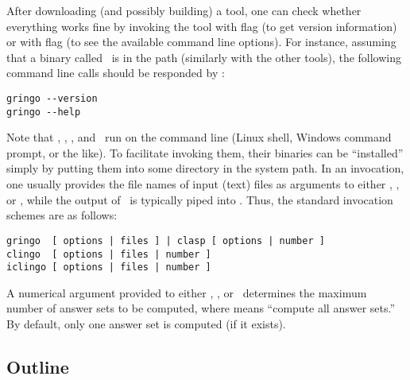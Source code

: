 After downloading (and possibly building) a tool,
one can check whether everything works fine by invoking the tool
with flag  (to get version information) or
with flag  (to see the available command line options).
For instance, assuming that a binary called \gringo\ is in the path
(similarly with the other tools),
the following command line calls should be responded by \gringo:
%
\begin{lstlisting}[numbers=none]
gringo --version
gringo --help
\end{lstlisting}
Note that \gringo, \clasp, \clingo, and \iclingo\ 
run on the command line (Linux shell, Windows command prompt, or the like).
To facilitate invoking them, their binaries can be ``installed''
simply by putting them into some directory in the system path.
In an invocation,
one usually provides the file names of input (text) files 
as arguments to either \gringo, \clingo, or \iclingo,
while the output of \gringo\ is typically piped into \clasp.
Thus, the standard invocation schemes are as follows:
\begin{lstlisting}[numbers=none]
gringo  [ options | files ] | clasp [ options | number ]
clingo  [ options | files | number ]
iclingo [ options | files | number ]
\end{lstlisting}
A numerical argument provided to either \clasp, \clingo, or \iclingo\
determines the maximum number of answer sets to be computed,
where \code{0} %
means ``compute all answer sets.''
By default, only one answer set is computed (if it exists).

\subsection{Outline}

